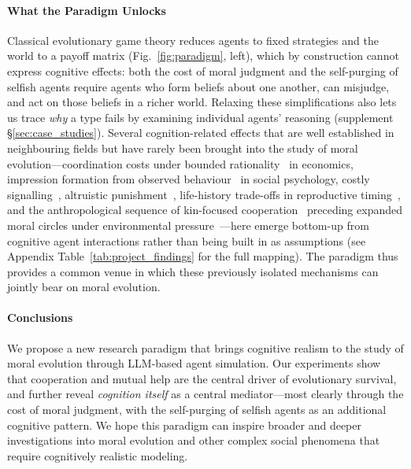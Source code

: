 \paragraph{What the Paradigm Unlocks}
Classical evolutionary game theory reduces agents to fixed strategies and the world to a payoff matrix (Fig.~\ref{fig:paradigm}, left), which by construction cannot express cognitive effects: both the cost of moral judgment and the self-purging of selfish agents require agents who form beliefs about one another, can misjudge, and act on those beliefs in a richer world. Relaxing these simplifications also lets us trace \emph{why} a type fails by examining individual agents' reasoning (supplement \S\ref{sec:case_studies}). Several cognition-related effects that are well established in neighbouring fields but have rarely been brought into the study of moral evolution---coordination costs under bounded rationality~\citep{simon1991bounded} in economics, impression formation from observed behaviour~\citep{asch1946forming} in social psychology, costly signalling~\citep{gintis2001costly, nowak2005evolution}, altruistic punishment~\citep{fehr2002altruistic}, life-history trade-offs in reproductive timing~\citep{kaplan1992evolution}, and the anthropological sequence of kin-focused cooperation~\citep{holden2003matriliny, mattison2011evolutionary} preceding expanded moral circles under environmental pressure~\citep{singer1981expanding}---here emerge bottom-up from cognitive agent interactions rather than being built in as assumptions (see Appendix Table~\ref{tab:project_findings} for the full mapping). The paradigm thus provides a common venue in which these previously isolated mechanisms can jointly bear on moral evolution.

\paragraph{Conclusions}
We propose a new research paradigm that brings cognitive realism to the study of moral evolution through LLM-based agent simulation. Our experiments show that cooperation and mutual help are the central driver of evolutionary survival, and further reveal \emph{cognition itself} as a central mediator---most clearly through the cost of moral judgment, with the self-purging of selfish agents as an additional cognitive pattern. We hope this paradigm can inspire broader and deeper investigations into moral evolution and other complex social phenomena that require cognitively realistic modeling.
